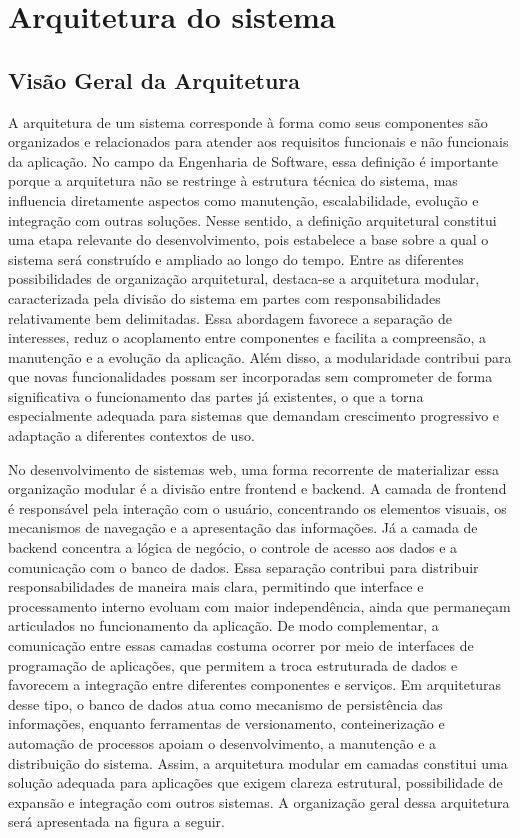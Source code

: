 \chapter{Arquitetura do sistema}
\label{chap4}

\section{Visão Geral da Arquitetura}

A arquitetura de um sistema corresponde à forma como seus componentes são organizados e relacionados para atender aos requisitos funcionais e não funcionais da aplicação. No campo da Engenharia de Software, essa definição é importante porque a arquitetura não se restringe à estrutura técnica do sistema, mas influencia diretamente aspectos como manutenção, escalabilidade, evolução e integração com outras soluções. Nesse sentido, a definição arquitetural constitui uma etapa relevante do desenvolvimento, pois estabelece a base sobre a qual o sistema será construído e ampliado ao longo do tempo.
Entre as diferentes possibilidades de organização arquitetural, destaca-se a arquitetura modular, caracterizada pela divisão do sistema em partes com responsabilidades relativamente bem delimitadas. Essa abordagem favorece a separação de interesses, reduz o acoplamento entre componentes e facilita a compreensão, a manutenção e a evolução da aplicação. Além disso, a modularidade contribui para que novas funcionalidades possam ser incorporadas sem comprometer de forma significativa o funcionamento das partes já existentes, o que a torna especialmente adequada para sistemas que demandam crescimento progressivo e adaptação a diferentes contextos de uso.

No desenvolvimento de sistemas web, uma forma recorrente de materializar essa organização modular é a divisão entre frontend e backend. A camada de frontend é responsável pela interação com o usuário, concentrando os elementos visuais, os mecanismos de navegação e a apresentação das informações. Já a camada de backend concentra a lógica de negócio, o controle de acesso aos dados e a comunicação com o banco de dados. Essa separação contribui para distribuir responsabilidades de maneira mais clara, permitindo que interface e processamento interno evoluam com maior independência, ainda que permaneçam articulados no funcionamento da aplicação.
De modo complementar, a comunicação entre essas camadas costuma ocorrer por meio de interfaces de programação de aplicações, que permitem a troca estruturada de dados e favorecem a integração entre diferentes componentes e serviços. Em arquiteturas desse tipo, o banco de dados atua como mecanismo de persistência das informações, enquanto ferramentas de versionamento, conteinerização e automação de processos apoiam o desenvolvimento, a manutenção e a distribuição do sistema. Assim, a arquitetura modular em camadas constitui uma solução adequada para aplicações que exigem clareza estrutural, possibilidade de expansão e integração com outros sistemas. A organização geral dessa arquitetura será apresentada na figura a seguir.

